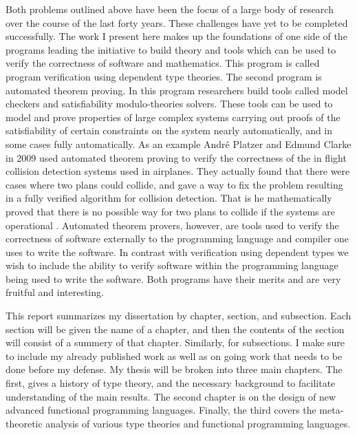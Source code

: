 Both problems outlined above have been the focus of a large body of
research over the course of the last forty years.  These challenges
have yet to be completed successfully.  The work I present here makes
up the foundations of one side of the programs leading the initiative
to build theory and tools which can be used to verify the correctness
of software and mathematics.  This program is called program
verification using dependent type theories.  The second program is
automated theorem proving.  In this program researchers build tools
called model checkers and satisfiability modulo-theories solvers.
These tools can be used to model and prove properties of large complex
systems carrying out proofs of the satisfiability of certain
constraints on the system nearly automatically, and in some cases
fully automatically.  As an example Andr\'{e} Platzer and Edmund
Clarke in 2009 used automated theorem proving to verify the
correctness of the in flight collision detection systems used in
airplanes.  They actually found that there were cases where two plans
could collide, and gave a way to fix the problem resulting in a fully
verified algorithm for collision detection.  That is he mathematically
proved that there is no possible way for two plans to collide if the
systems are operational \cite{DBLP:conf/fm/PlatzerC09}.  Automated
theorem provers, however, are tools used to verify the correctness of
software externally to the programming language and compiler one uses
to write the software.  In contrast with verification using dependent
types we wish to include the ability to verify software within the
programming language being used to write the software. Both programs
have their merits and are very fruitful and interesting.

This report summarizes my dissertation by chapter, section, and
subsection.  Each section will be given the name of a chapter, and
then the contents of the section will consist of a summery of that
chapter.  Similarly, for subsections.  I make sure to include my
already published work as well as on going work that needs to be done
before my defense.  My thesis will be broken into three main chapters.
The first, gives a history of type theory, and the necessary
background to facilitate understanding of the main results. The second
chapter is on the design of new advanced functional programming
languages.  Finally, the third covers the meta-theoretic analysis of
various type theories and functional programming languages.

